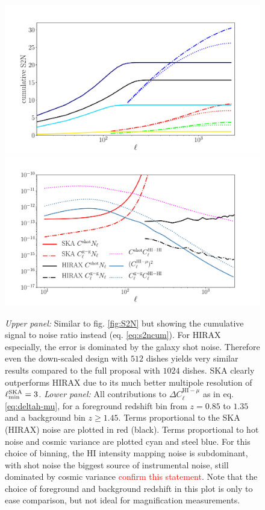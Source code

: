 \documentclass[useAMS,usenatbib]{mnras}
\newcommand{\ama}[1]{\textcolor{red}{{#1}}}
\begin{document}
\begin{figure}
\centering\includegraphics[width=.99\columnwidth]{S2N_SKA_HIRAX_CUM.pdf}
\centering\includegraphics[width=.99\columnwidth]{X_error_contributions.pdf}
\captionsetup{width=.9\linewidth}

\caption{{\sl Upper panel:} Similar to fig. \ref{fig:S2N} but showing the cumulative signal to noise ratio instead (eq. \ref{eq:s2ncum}). For HIRAX especially, the error is dominated by the galaxy shot noise. Therefore even the down-scaled design with $512$ dishes yields very similar results compared to the full proposal with $1024$ dishes. SKA clearly outperforms HIRAX due to its much better multipole resolution of $\ell_{\rm min}^{\rm SKA} = 3$.
{\sl Lower panel:} All contributions to $\Delta C_\ell^{\mathrm{HI-}\mu}$ as in eq. \ref{eq:deltah-mu}, for a foreground redshift bin from $z=0.85$ to $1.35$ and a background bin $z\geq1.45$. Terms proportional to the SKA (HIRAX) noise are plotted in red (black). Terms proportional to hot noise and cosmic variance are plotted cyan and steel blue. For this choice of binning, the HI intensity mapping noise is subdominant, with shot noise the biggest source of instrumental noise, still dominated by cosmic variance \ama{confirm this statement}. Note that the choice of foreground and background redshift in this plot is only to ease comparison, but not ideal for magnification measurements.}
\label{fig:S2N_cum}
\label{fig:x_error_contributions}
\end{figure}
\end{document}
